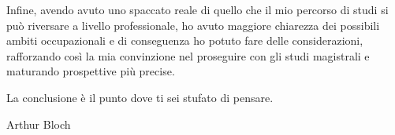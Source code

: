 Infine, avendo avuto uno spaccato reale di quello che il mio percorso di studi si può riversare a livello professionale, ho avuto maggiore chiarezza dei possibili ambiti occupazionali e di conseguenza ho potuto fare delle considerazioni, rafforzando così la mia convinzione nel proseguire con gli studi magistrali e maturando prospettive più precise.


\epigraph{La conclusione è il punto dove ti sei stufato di pensare.}{Arthur Bloch}